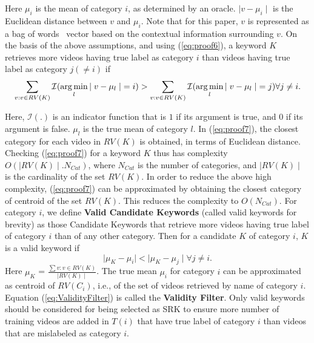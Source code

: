 Here $\mu_i$ is the mean of category $i$, as determined by an oracle. $ \mid v - \mu_i \mid$ is the Euclidean distance between $v$ and $\mu_i$. Note that for this paper, $v$ is represented as a bag of words~\cite{salton1975vector} vector based on the contextual information surrounding $v$. On the basis of the above assumptions, and using (\ref{eq:proof6}), a keyword $K$ retrieves more videos having true label as category $i$ than videos having true label as category $j ( \neq  i)$ if
\begin{equation}
\sum_{v:v\in RV(K)}\mathcal{I}(\operatorname*{arg\,min}_l{\mid v-\mu_l \mid}=i) > \sum_{v:v\in RV(K)}\mathcal{I}(\operatorname*{arg\,min}_l{\mid v-\mu_l \mid}=j)  \forall j \neq i.
\label{eq:proof7}
\end{equation}

Here, $\mathcal{I}(.)$ is an indicator function that is $1$ if its argument is true, and $0$ if its argument is false. $\mu_l$ is the true mean of category $l$. In (\ref{eq:proof7}), the closest category for each video in $RV(K)$ is obtained, in terms of Euclidean distance. Checking (\ref{eq:proof7}) for a keyword $K$ thus has complexity $O( \mid RV(K) \mid.N_{Cat})$, where $N_{Cat}$ is the number of categories, and $\mid RV(K) \mid$ is the cardinality of the set $RV(K)$. In order to reduce the above high complexity, (\ref{eq:proof7}) can be approximated by obtaining the closest category of centroid of the set $RV(K)$. This reduces the complexity to $O(N_{Cat})$. For category $i$, we define \textbf{Valid Candidate Keywords} (called valid keywords for brevity) as those Candidate Keywords that retrieve more videos having true label of category $i$ than of any other category. Then for a candidate $K$ of category $i$, $K$ is a valid keyword if 
\begin{equation} \label{eq:ValidityFilter}
\mid \mu_K - \mu_i \mid < \mid \mu_K - \mu_j \mid \forall j \neq i. 
\end{equation}
Here $\mu_K$ =  $\frac{ \sum{v:v \in RV(K)} }{\mid RV(K) \mid}$. The true mean $\mu_i$ for category $i$ can be approximated as centroid of $RV(C_i)$, i.e., of the set of videos retrieved by name of category $i$. Equation (\ref{eq:ValidityFilter}) is called the \textbf{Validity Filter}. Only valid keywords should be considered for being selected as SRK to ensure more number of training videos are added in $T(i)$ that have true label of category $i$ than videos that are mislabeled as category $i$. 

